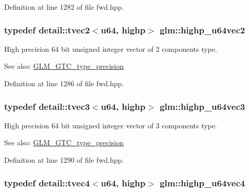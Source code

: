 Definition at line 1282 of file fwd.hpp.\hypertarget{group__gtc__type__precision_gd11667a4764867732a89791ec2a01aeb}{
\subsubsection[highp\_\-u64vec2]{\setlength{\rightskip}{0pt plus 5cm}typedef detail::tvec2$<$u64, highp$>$ {\bf glm::highp\_\-u64vec2}}}
\label{group__gtc__type__precision_gd11667a4764867732a89791ec2a01aeb}


High precision 64 bit unsigned integer vector of 2 components type. \begin{Desc}
\item[See also:]\hyperlink{group__gtc__type__precision}{GLM\_\-GTC\_\-type\_\-precision} \end{Desc}


Definition at line 1286 of file fwd.hpp.\hypertarget{group__gtc__type__precision_g3cb5c038f8cba0dfb894af66b7b2ba13}{
\subsubsection[highp\_\-u64vec3]{\setlength{\rightskip}{0pt plus 5cm}typedef detail::tvec3$<$u64, highp$>$ {\bf glm::highp\_\-u64vec3}}}
\label{group__gtc__type__precision_g3cb5c038f8cba0dfb894af66b7b2ba13}


High precision 64 bit unsigned integer vector of 3 components type. \begin{Desc}
\item[See also:]\hyperlink{group__gtc__type__precision}{GLM\_\-GTC\_\-type\_\-precision} \end{Desc}


Definition at line 1290 of file fwd.hpp.\hypertarget{group__gtc__type__precision_g8aa6fc9f16dfa3078d411f6361188a45}{
\subsubsection[highp\_\-u64vec4]{\setlength{\rightskip}{0pt plus 5cm}typedef detail::tvec4$<$u64, highp$>$ {\bf glm::highp\_\-u64vec4}}}
\label{group__gtc__type__precision_g8aa6fc9f16dfa3078d411f6361188a45}


